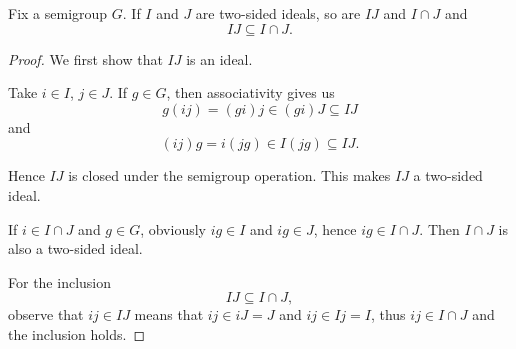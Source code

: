 \begin{proposition}\label{thm:product_of_semigroup_ideals_is_in_intersection}
  Fix a semigroup \( G \). If \( I \) and \( J \) are two-sided ideals, so are \( IJ \) and \( I \cap J \) and
  \begin{equation*}
    IJ \subseteq I \cap J.
  \end{equation*}
\end{proposition}
\begin{proof}
  We first show that \( IJ \) is an ideal.

  Take \( i \in I \), \( j \in J \). If \( g \in G \), then associativity gives us
  \begin{equation*}
    g(ij) = (gi)j \in (gi)J \subseteq IJ
  \end{equation*}
  and
  \begin{equation*}
    (ij)g = i(jg) \in I(jg) \subseteq IJ.
  \end{equation*}

  Hence \( IJ \) is closed under the semigroup operation. This makes \( IJ \) a two-sided ideal.

  If \( i \in I \cap J \) and \( g \in G \), obviously \( ig \in I \) and \( ig \in J \), hence \( ig \in I \cap J \). Then \( I \cap J \) is also a two-sided ideal.

  For the inclusion
  \begin{equation*}
    IJ \subseteq I \cap J,
  \end{equation*}
  observe that \( ij \in IJ \) means that \( ij \in iJ = J \) and \( ij \in Ij = I \), thus \( ij \in I \cap J \) and the inclusion holds.
\end{proof}

